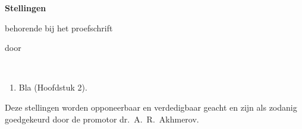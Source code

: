\documentclass{dissertation}
\begin{document}
\clearpage
{

\begin{center}

{\Large\titlefont\bfseries Stellingen}

\medskip

behorende bij het proefschrift

\medskip

{\makeatletter
\titlestyle\bfseries\large\@title
\makeatother}

{\makeatletter
\ifx\@subtitle\undefined\else
    \titlefont\titleshape\@subtitle
\fi
\makeatother}

\medskip

door

\medskip

\makeatletter
{\large\titlefont\bfseries\@firstname\ {\titleshape\@lastname}}
\makeatother

\end{center}

\smallskip

\begin{enumerate}
\itemsep-0.08em

\item Bla (Hoofdstuk 2).


\end{enumerate}

\smallskip

\begin{center}
Deze stellingen worden opponeerbaar en verdedigbaar geacht en zijn als zodanig goedgekeurd door de promotor dr.\ A.\ R.\ Akhmerov.
\end{center}

}
\end{document}
